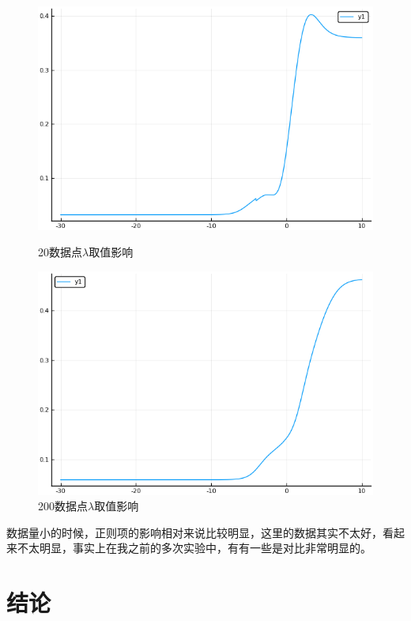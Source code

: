 \documentclass{ML}
\begin{document}
\begin{figure}[H]
	\begin{minipage}[c]{0.5\linewidth}
		\centering
		\includegraphics[width=0.9\linewidth]{media/20/ConjugationWithLambda-Lambda-err}
		\caption{20数据点$\lambda$取值影响}
		\label{fig:conlambdaerr20}
	\end{minipage}
	\begin{minipage}[c]{0.5\linewidth}
		\centering
		\includegraphics[width=0.9\linewidth]{media/200/ConjugationWithLambda-Lambda-err}
		\caption{200数据点$\lambda$取值影响}
		\label{fig:conlambdaerr200}
	\end{minipage}
\end{figure}

数据量小的时候，正则项的影响相对来说比较明显，这里的数据其实不太好，看起来不太明显，事实上在我之前的多次实验中，有有一些是对比非常明显的。

\section{结论}
\end{document}
